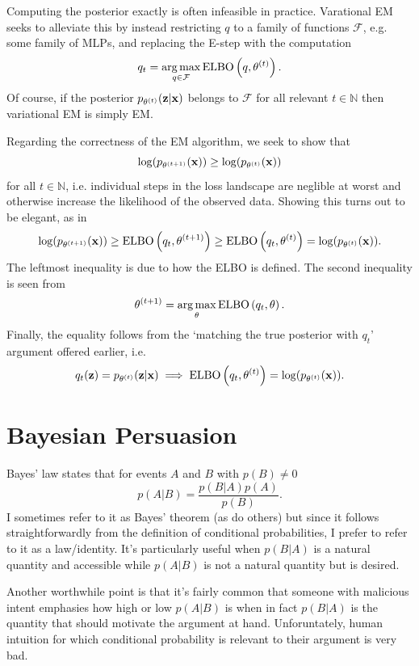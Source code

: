 \documentclass[11pt]{article}
\begin{document}
\begin{appendices}
\begin{tcolorbox}[title={\centering\textbf{Variational EM}}, colback=myLightBlue, colbacktitle=myDarkBlue, colframe=myDarkBlue, coltitle=white]
    Computing the posterior exactly is often infeasible in practice. Varational EM seeks to alleviate this by instead restricting $q$ to a family of functions $\mathcal{F}$, e.g. some family of MLPs, and replacing the E-step with the computation
    $$
    q_t
    =
    \operatorname*{arg\,max}_{q\in\mathcal{F}}\text{ELBO}\left(q,\theta^{(t)}\right).
    $$
    Of course, if the posterior $p_{\theta^{(t)}}(\mathbf{z}|\mathbf{x})$ belongs to $\mathcal{F}$ for all relevant $t\in\mathbb{N}$ then variational EM is simply EM.
\end{tcolorbox}
Regarding the correctness of the EM algorithm, we seek to show that
$$
\log(p_{\theta^{(t+1)}}(\mathbf{x}))
\geq
\log(p_{\theta^{(t)}}(\mathbf{x}))
$$
for all $t\in\mathbb{N}$, i.e. individual steps in the loss landscape are neglible at worst and otherwise increase the likelihood of the observed data. Showing this turns out to be elegant, as in
$$
\log(p_{\theta^{(t+1)}}(\mathbf{x}))
\geq
\text{ELBO}\left(q_t,\theta^{(t+1)}\right)
\geq
\text{ELBO}\left(q_t,\theta^{(t)}\right)
=
\log(p_{\theta^{(t)}}(\mathbf{x})).
$$
The leftmost inequality is due to how the ELBO is defined. The second inequality is seen from
$$
\theta^{(t+1)}
=
\operatorname*{arg\,max}_{\theta}\text{ELBO}\left(q_t,\theta\right).
$$
Finally, the equality follows from the `matching the true posterior with $q_t$' argument offered earlier, i.e.
$$
q_t(\mathbf{z})=p_{\theta^{(t)}}(\mathbf{z}|\mathbf{x})
\implies
\text{ELBO}\left(q_t,\theta^{(t)}\right)=\log(p_{\theta^{(t)}}(\mathbf{x})).
$$

\section{Bayesian Persuasion}
Bayes' law states that for events $A$ and $B$ with $p(B)\neq0$
$$
p(A|B)
=
\frac{p(B|A)p(A)}{p(B)}.
$$
I sometimes refer to it as Bayes' theorem (as do others) but since it follows straightforwardly from the definition of conditional probabilities, I prefer to refer to it as a law/identity. It's particularly useful when $p(B|A)$ is a natural quantity and accessible while $p(A|B)$ is not a natural quantity but is desired.

Another worthwhile point is that it's fairly common that someone with malicious intent emphasies how high or low $p(A|B)$ is when in fact $p(B|A)$ is the quantity that should motivate the argument at hand. Unforuntately, human intuition for which conditional probability is relevant to their argument is very bad.


\end{appendices}
\end{document}
